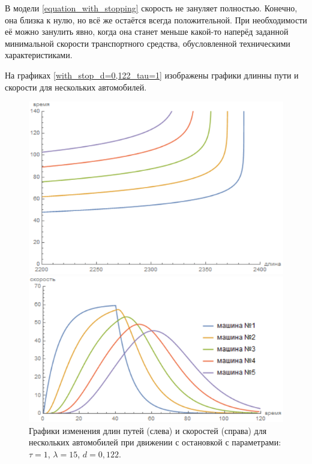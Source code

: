 \documentclass[12pt, a4paper]{extarticle}
\numberwithin{equation}{section}
\begin{document}
В модели \eqref{equation_with_stopping} скорость не зануляет полностью. Конечно, она близка к нулю, но всё же остаётся всегда положительной. При необходимости её можно занулить явно, когда она станет меньше какой-то наперёд заданной минимальной скорости транспортного средства, обусловленной техническими характеристиками. 
 
На графиках \eqref{with_stop_d=0,122_tau=1} изображены графики длинны пути и скорости для нескольких автомобилей. 
 \begin{figure}[h!]
 	\begin{center}
 		\begin{minipage}[h!]{0.48\linewidth}
 			\includegraphics[width=1\linewidth,height=0.2\textheight]
 			{Images/distance_with_stop_d=0,122_tau=1.png}
 		\end{minipage}
 		\hfill 
 		\begin{minipage}[h!]{0.48\linewidth}
 			\includegraphics[width=1\linewidth,height=0.2\textheight]
 			{Images/speed_with_stop_d=0,122_tau=1.png}
 		\end{minipage}
 		\caption{Графики изменения длин путей (слева) и скоростей (справа) для нескольких автомобилей при движении с остановкой с параметрами: $\tau=1$, $\lambda=15$, $d=0,122$.}
 		\label{with_stop_d=0,122_tau=1}
 	\end{center}
 \end{figure}
\end{document}
